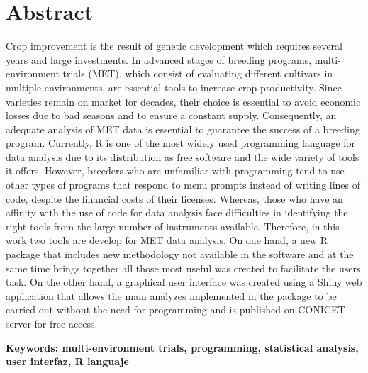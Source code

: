
\chapter*{Abstract}


Crop improvement is the result of genetic development which requires several years and large investments. In advanced stages of breeding programs, multi-environment trials (MET), which consist of evaluating different cultivars in multiple environments, are essential tools to increase crop productivity. Since varieties remain on market for decades, their choice is essential to avoid economic losses due to bad seasons and to ensure a constant supply. Consequently, an adequate analysis of MET data is essential to guarantee the success of a breeding program. Currently, R is one of the most widely used programming language for data analysis due to its distribution as free software and the wide variety of tools it offers. However, breeders who are unfamiliar with programming tend to use other types of programs that respond to menu prompts instead of writing lines of code, despite the financial costs of their licenses. Whereas, those who have an affinity with the use of code for data analysis face difficulties in identifying the right tools from the large number of instruments available. Therefore, in this work two tools are develop for MET data analysis. On one hand, a new R package that includes new methodology not available in the software and at the same time brings together all those most useful  was created to facilitate the users task. On the other hand, a graphical user interface was created using a Shiny web application that allows the main analyzes implemented in the package to be carried out without the need for programming and is published on CONICET server for free access. 

\textbf{Keywords: multi-environment trials, programming, statistical analysis, user interfaz, R languaje}

